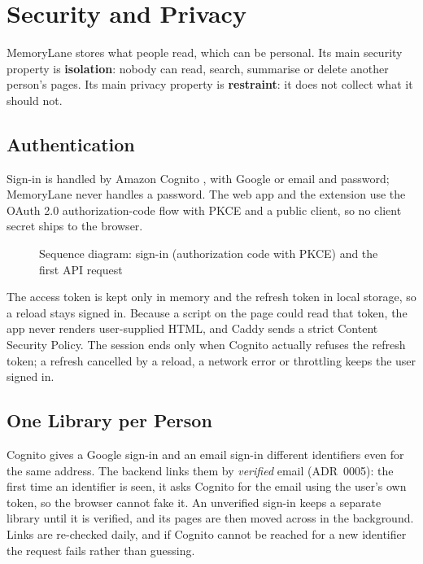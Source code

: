 
\chapter{Security and Privacy}
\label{ch:security}

MemoryLane stores what people read, which can be personal. Its main security
property is \textbf{isolation}: nobody can read, search, summarise or delete
another person's pages. Its main privacy property is \textbf{restraint}: it
does not collect what it should not.

\section{Authentication}

Sign-in is handled by Amazon Cognito \cite{cognito}, with Google or email
and password; MemoryLane never handles a password. The web app and the
extension use the OAuth 2.0 authorization-code flow \cite{rfc6749} with PKCE
\cite{rfc7636} and a public client, so no client secret ships to the
browser.

\begin{figure}[!htbp]
\centering

\caption{Sequence diagram: sign-in (authorization code with PKCE) and the first API request}
\label{fig:seq-signin}
\end{figure}

The access token is kept only in memory and the refresh token in local
storage, so a reload stays signed in. Because a script on the page could read
that token, the app never renders user-supplied HTML, and Caddy sends a
strict Content Security Policy. The session ends only when Cognito actually
refuses the refresh token; a refresh cancelled by a reload, a network error
or throttling keeps the user signed in.

\section{One Library per Person}

Cognito gives a Google sign-in and an email sign-in different identifiers
even for the same address. The backend links them by \emph{verified} email
(ADR~0005): the first time an identifier is seen, it asks Cognito for the
email using the user's own token, so the browser cannot fake it. An
unverified sign-in keeps a separate library until it is verified, and its
pages are then moved across in the background. Links are re-checked daily,
and if Cognito cannot be reached for a new identifier the request fails
rather than guessing.

